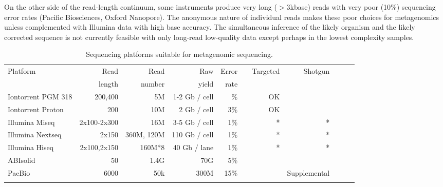 \documentclass[graybox]{svmult}
\begin{document}
On the other side of the read-length continuum, some instruments produce very long ($>$3kbase) reads with very poor (10\%) sequencing error rates (Pacific Biosciences, Oxford Nanopore).   The anonymous nature of individual reads makes these poor choices for metagenomics unless complemented with Illumina data with high base accuracy.  The simultaneous inference of the likely organism and the likely corrected sequence is not currently feasible with only long-read low-quality data except perhaps in the lowest complexity samples. 


\begin{table}
\caption{Sequencing platforms suitable for metagenomic sequencing.}
\begin{tabular}{lrrrrrrrrrr}
Platform &  Read & Read & Raw   & Error &       &  Targeted & Shotgun  \\
      & length & number & yield &  rate &       &           &         \\
Iontorrent PGM 318 &  200,400 & 5M & 1-2 Gb / cell & \% &  & OK &   \\
Iontorrent Proton &  200 & 10M & 2 Gb / cell & 3\% &  & OK &   \\
Illumina Miseq &  2x100-2x300 & 16M & 3-5 Gb / cell & 1\% &  & * & * \\
Illumina Nextseq &  2x150 & 360M, 120M & 110 Gb / cell & 1\% &  & * & * \\
Illumina Hiseq & 2x100,2x150 & 160M*8 & 40 Gb / lane & 1\% &  & * & * \\
ABIsolid & 50 & 1.4G & 70G & 5\% &  &  &   \\
PacBio &  6000 & 50k &300M  & 15\% &  &  & Supplemental  \\
  \\
\end{tabular}
\end{table}


\end{document}
